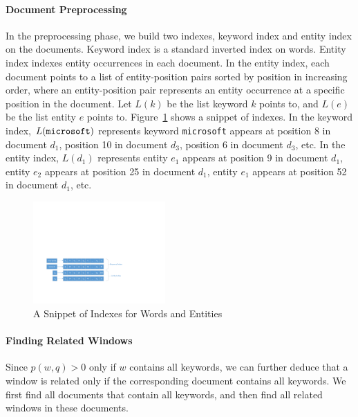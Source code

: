 \documentclass{sig-alternate}
\theoremstyle{definition}
\begin{document}
\paragraph*{Document Preprocessing} In the preprocessing phase, we build two indexes, keyword index and entity index on the documents. Keyword index is a standard inverted index on words. Entity index indexes entity occurrences in each document. In the entity index, each document points to a list of entity-position pairs sorted by position in increasing order, where an entity-position pair represents an entity occurrence at a specific position in the document. Let $L(k)$ be the list keyword $k$ points to, and $L(e)$ be the list entity $e$ points to. Figure~\ref{fig:index2} shows a snippet of indexes. In the keyword index, $L(\mbox{\tt microsoft})$ represents keyword {\tt microsoft} appears at position 8 in document $d_1$, position 10 in document $d_3$, position 6 in document $d_3$, etc. In the entity index, $L(d_1)$ represents entity $e_1$ appears at position 9 in document $d_1$, entity $e_2$ appears at position 25 in document $d_1$, entity $e_1$ appears at position 52 in document $d_1$, etc.
\begin{figure}[htbp]
\center
\includegraphics[width=0.45\textwidth]{img/index2.pdf}
\caption{A Snippet of Indexes for Words and Entities\label{fig:index2}}
\end{figure}

\paragraph*{Finding Related Windows} Since $p(w, q) > 0$ only if $w$ contains all keywords, we can further deduce that a window is related only if the corresponding document contains all keywords. We first find all documents that contain all keywords, and then find all related windows in these documents.
\end{document}
